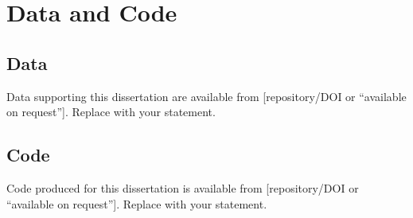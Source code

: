 
\chapter{Data and Code}


\section{Data}
Data supporting this dissertation are available from [repository/DOI or ``available on request'']. Replace with your statement.

\section{Code}
Code produced for this dissertation is available from [repository/DOI or ``available on request'']. Replace with your statement.

